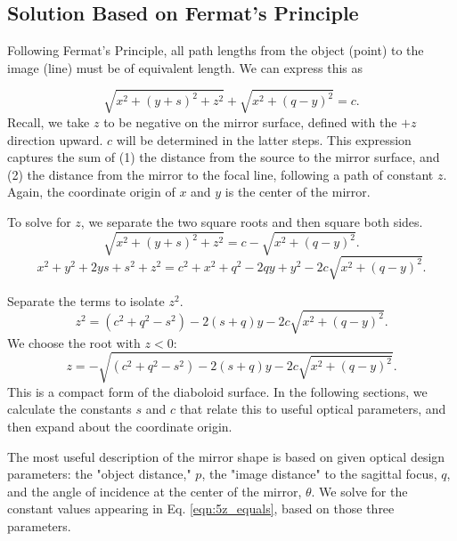 \documentclass{iucr}              %
\newcommand{\inblue}[1]{{\color{blue}#1}}
\begin{document}
\inblue{
\subsection{Solution Based on Fermat's Principle}
}

Following Fermat's Principle, all path lengths from the object (point) to the image (line) must be of equivalent length. We can express this as

\begin{equation}
\label{eqn:1Fermat}
\sqrt{x^2 + (y+s)^2 + z^2} + \sqrt{x^2 + (q-y)^2} = c.
\end{equation}
Recall, we take $z$ to be negative on the mirror surface, defined with the $+z$ direction upward. $c$ will be determined in the latter steps.
This expression captures the sum of (1) the distance from the source to the mirror surface, and (2) the distance from the mirror to the focal line, following a path of constant $z$. Again, the coordinate origin of $x$ and $y$ is the center of the mirror.

To solve for $z$, we separate the two square roots and then square both sides.
\begin{equation}
\label{eqn:2swapping}
\sqrt{x^2 + (y+s)^2 + z^2}  = c - \sqrt{x^2 + (q-y)^2}.
\end{equation}
\begin{equation}
\label{eqn:3squaring}
x^2 + y^2 + 2 y s + s^2 + z^2  = c^2 + x^2  + q^2 - 2 q y + y^2 - 2 c \sqrt{x^2 + (q-y)^2}.
\end{equation}

Separate the terms to isolate $z^2$.
\begin{equation}
\label{eqn:4isolatingz_2}
z^2 = (c^2 + q^2 - s^2) - 2 (s  + q) y - 2 c \sqrt{x^2 + (q-y)^2}.
\end{equation}
We choose the root with $z < 0$:
\begin{equation}
\label{eqn:5z_equals}
z = - \sqrt{(c^2 + q^2 - s^2) - 2 (s  + q) y - 2 c \sqrt{x^2 + (q-y)^2}}.
\end{equation}
This is a compact form of the diaboloid surface. In the following sections, we calculate the constants $s$ and $c$ that relate this to useful optical parameters, and then expand about the coordinate origin.

The most useful description of the mirror shape is based on given optical design parameters: the "object distance," $p$, the "image distance" to the sagittal focus, $q$, and the angle of incidence at the center of the mirror, $\theta$. We solve for the constant values appearing in Eq. \ref{eqn:5z_equals}, based on those three parameters.
\end{document}
